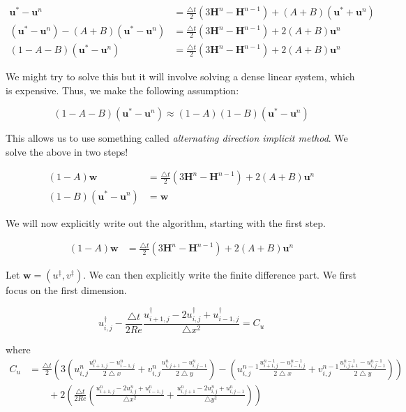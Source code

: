 \documentclass[12pt]{article}
\begin{document}
\begin{align*}
\mathbf{u}^* - \mathbf{u}^n &= \frac{\bigtriangleup t}{2}(3\mathbf{H}^n - \mathbf{H}^{n-1}) + (A + B)(\mathbf{u}^* + \mathbf{u}^n) \\
(\mathbf{u}^* - \mathbf{u}^n) - (A + B)(\mathbf{u}^* - \mathbf{u}^n) &= \frac{\bigtriangleup t}{2}(3\mathbf{H}^n - \mathbf{H}^{n-1}) + 2(A + B)\mathbf{u}^n \\
(1 - A - B)(\mathbf{u}^* - \mathbf{u}^n) &= \frac{\bigtriangleup t}{2}(3\mathbf{H}^n - \mathbf{H}^{n-1}) + 2(A + B)\mathbf{u}^n
\end{align*}

We might try to solve this but it will involve solving a dense linear system, which is expensive. Thus, we make the following assumption:

\begin{equation}
(1 - A - B)(\mathbf{u}^* - \mathbf{u}^n) \approx (1 - A)(1 - B)(\mathbf{u}^* - \mathbf{u}^n)
\end{equation}

This allows us to use something called \textit{alternating direction implicit method}. We solve the above in two steps!

\begin{align}
(1 - A)\mathbf{w} &= \frac{\bigtriangleup t}{2}(3\mathbf{H}^n - \mathbf{H}^{n-1}) + 2(A + B)\mathbf{u}^n \\
(1 - B)(\mathbf{u}^* - \mathbf{u}^n) &= \mathbf{w}
\end{align}

We will now explicitly write out the algorithm, starting with the first step.

\begin{align*}
    (1 - A)\mathbf{w} &= \frac{\bigtriangleup t}{2}(3\mathbf{H}^n - \mathbf{H}^{n-1}) + 2(A + B)\mathbf{u}^n
\end{align*}

Let $\mathbf{w} = (u^\ddagger, v^\ddagger)$. We can then explicitly write the finite difference part. We first focus on the first dimension.

\begin{equation}
    u^\dagger_{i,j} - \frac{\bigtriangleup t}{2 Re} \frac{u^\dagger_{i+1,j} - 2u^\dagger_{i,j} + u^\dagger_{i-1,j}}{\bigtriangleup x^2} = C_u
\end{equation}

where
\begin{align*}
    C_u &= \frac{\bigtriangleup t}{2}(3(u^n_{i,j}\frac{u^n_{i+1,j} - u^n_{i-1,j}}{2\bigtriangleup x} + v^n_{i,j}\frac{u^n_{i,j+1} - u^n_{i,j-1}}{2\bigtriangleup y}) - (u^{n-1}_{i,j}\frac{u^{n-1}_{i+1,j} - u^{n-1}_{i-1,j}}{2\bigtriangleup x} + v^{n-1}_{i,j}\frac{u^{n-1}_{i,j+1} - u^{n-1}_{i,j-1}}{2\bigtriangleup y})) \\
    & \qquad + 2(\frac{\bigtriangleup t}{2 Re}(\frac{u^n_{i+1,j} -2u^n_{i,j} + u^n_{i-1,j}}{\bigtriangleup x^2} + \frac{u^n_{i,j+1} -2u^n_{i,j} + u^n_{i,j-1}}{\bigtriangleup y^2}))
\end{align*}
\end{document}

